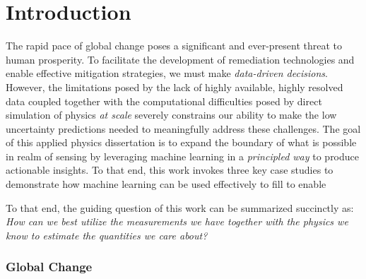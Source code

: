 \chapter{Introduction}


The rapid pace of global change poses a significant and ever-present threat to human prosperity. To facilitate the development of remediation technologies and enable effective mitigation strategies, we must make \textit{data-driven decisions}. However, the limitations posed by the lack of highly available, highly resolved data coupled together with the computational difficulties posed by direct simulation of physics \textit{at scale} severely constrains our ability to make the low uncertainty predictions needed to meaningfully address these challenges. The goal of this applied physics dissertation is to expand the boundary of what is possible in realm of sensing by leveraging machine learning in a \textit{principled way} to produce actionable insights. To that end, this work invokes three key case studies to demonstrate how machine learning can be used effectively to fill to enable


To that end, the guiding question of this work can be summarized succinctly as: \textit{How can we best utilize the measurements we have together with the physics we know to estimate the quantities we care about?}





\subsection{Global Change}


\subsection{}

